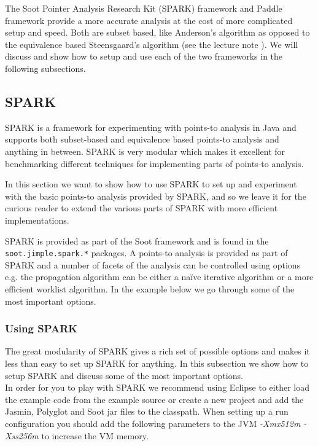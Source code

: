 \documentclass{article}
\newcommand{\code}[1]{\texttt{\small #1}}
\begin{document}
The Soot Pointer Analysis Research Kit (SPARK) framework and Paddle
framework provide a more accurate analysis at the cost of more
complicated setup and speed. Both are subset based, like Anderson's
algorithm as opposed to the equivalence based Steensgaard's algorithm
(see the lecture note \cite{sanote}). We will discuss and show how to
setup and use each of the two frameworks in the following subsections.

\subsection{SPARK}
SPARK is a framework for experimenting with points-to analysis in Java
and supports both subset-based and equivalence based points-to
analysis and anything in between. SPARK is very modular which makes it
excellent for benchmarking different techniques for implementing parts
of points-to analysis.

In this section we want to show how to use SPARK to set up and
experiment with the basic points-to analysis provided by SPARK, and so
we leave it for the curious reader to extend the various parts of
SPARK with more efficient implementations.

SPARK is provided as part of the Soot framework and is found in the
\code{soot.jimple.spark.*} packages. A points-to analysis is provided
as part of SPARK and a number of facets of the analysis can be
controlled using options e.g. the propagation algorithm can be either
a na\"ive iterative algorithm or a more efficient worklist algorithm.
In the example below we go through some of the most important options.

\subsubsection*{Using SPARK}
The great modularity of SPARK gives a rich set of possible options and
makes it less than easy to set up SPARK for anything. In this
subsection we show how to setup SPARK and discuss some of the most
important options.\\


In order for you to play with SPARK we recommend using Eclipse to
either load the example code from the example source or create a new
project and add the Jasmin, Polyglot and Soot jar files to the
classpath.  When setting up a run configuration you should add the
following parameters to the JVM \emph{-Xmx512m -Xss256m} to increase
the VM memory.\\
\end{document}
